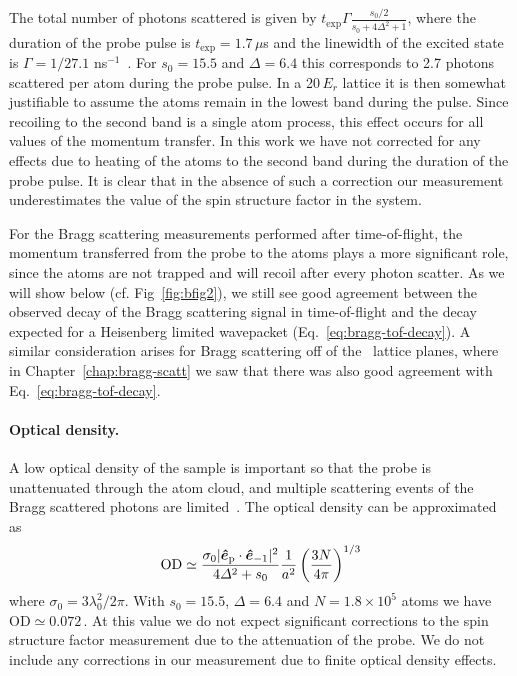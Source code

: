 The total number of photons scattered is given by  $t_{\text{exp}} \Gamma
\frac{s_{0}/2}{s_{0} + 4\Delta^{2}+1 }$,  where the duration of the probe pulse
is $t_{\text{exp}}=1.7\,\mu$s and the linewidth of the excited state is
$\Gamma=1/27.1$\,\,ns$^{-1}$~\cite{McAlexander1996}.  For $s_{0}=15.5$ and
$\Delta = 6.4$ this corresponds to 2.7 photons scattered per atom during the
probe pulse.   In a 20\,$E_{r}$ lattice it is then somewhat justifiable to
assume the atoms remain in the lowest band during the pulse.  Since recoiling
to the second band is a single atom process, this effect occurs for all values
of the momentum transfer.  In this work we have not corrected for any effects
due to heating of the atoms to the second band during the duration of the probe
pulse.  It is clear that in the absence of such a correction our measurement
underestimates the value of the spin structure factor in the system.  

For the Bragg scattering measurements performed after time-of-flight, the
momentum transferred from the probe to the atoms plays a more significant role,
since the atoms are not trapped and will recoil after every photon scatter.  As
we will show below (cf. Fig~\ref{fig:bfig2}), we still see good agreement
between the observed decay of the Bragg scattering signal in time-of-flight and
the decay expected for a Heisenberg limited wavepacket
(Eq.~\ref{eq:bragg-tof-decay}).   A similar consideration arises for Bragg
scattering off of the \zoz\ lattice planes,  where in
Chapter~\ref{chap:bragg-scatt} we saw that there was also good agreement with
Eq.~\ref{eq:bragg-tof-decay}.  


\paragraph{Optical density.} A low optical density of the sample is important
so that the probe is unattenuated through the atom cloud, and multiple
scattering events of the Bragg scattered photons are
limited~\cite{Ted2010}.  The optical density  can be approximated as
\begin{equation*}
   \text{OD}
  \simeq
    \frac{ \sigma_{0} | \bm{\hat{e}}_{\text{p}} \cdot \bm{\hat{e}}_{-1} |^{2}}
         {  4 \Delta^{2} + s_{0} }
    \frac{1}{a^{2}}
    \left(\frac{ 3N}{4\pi} \right)^{1/3}
\end{equation*}
where $\sigma_{0}=3\lambda_{0}^{2}/2\pi$.  With $s_{0}=15.5$,
$\Delta=6.4$  and $N=1.8\times10^{5}$ atoms we have
$\text{OD}\simeq0.072$\,.  At this value we do not expect significant
corrections to the spin structure factor measurement due to the attenuation of
the probe.  We do not include any corrections in our measurement due to
finite optical density effects. 


